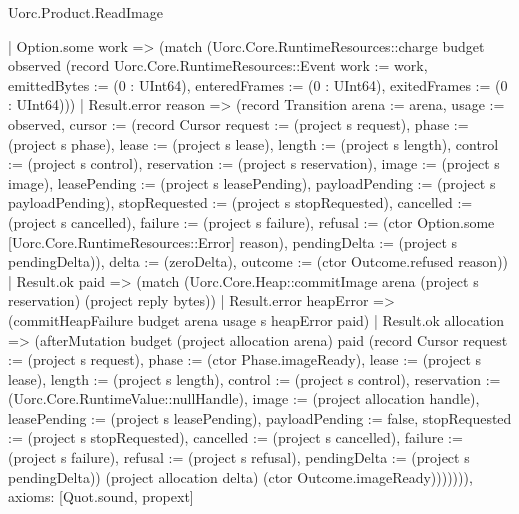 \begin{lexlean}{Uorc.Product.ReadImage}
\begin{semanticmodule}
{        | Option.some work => (match (Uorc.Core.RuntimeResources::charge budget observed (record Uorc.Core.RuntimeResources::Event {work := work, emittedBytes := (0 : UInt64), enteredFrames := (0 : UInt64), exitedFrames := (0 : UInt64)}))
          | Result.error reason => (record Transition {arena := arena, usage := observed, cursor := (record Cursor {request := (project s request), phase := (project s phase), lease := (project s lease), length := (project s length), control := (project s control), reservation := (project s reservation), image := (project s image), leasePending := (project s leasePending), payloadPending := (project s payloadPending), stopRequested := (project s stopRequested), cancelled := (project s cancelled), failure := (project s failure), refusal := (ctor Option.some [Uorc.Core.RuntimeResources::Error] reason), pendingDelta := (project s pendingDelta)}), delta := (zeroDelta), outcome := (ctor Outcome.refused reason)})
          | Result.ok paid => (match (Uorc.Core.Heap::commitImage arena (project s reservation) (project reply bytes))
            | Result.error heapError => (commitHeapFailure budget arena usage s heapError paid)
            | Result.ok allocation => (afterMutation budget (project allocation arena) paid (record Cursor {request := (project s request), phase := (ctor Phase.imageReady), lease := (project s lease), length := (project s length), control := (project s control), reservation := (Uorc.Core.RuntimeValue::nullHandle), image := (project allocation handle), leasePending := (project s leasePending), payloadPending := false, stopRequested := (project s stopRequested), cancelled := (project s cancelled), failure := (project s failure), refusal := (project s refusal), pendingDelta := (project s pendingDelta)}) (project allocation delta) (ctor Outcome.imageReady))))))),
  axioms: [Quot.sound, propext]
}


\end{semanticmodule}
\end{lexlean}
